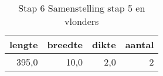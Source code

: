 \begin{table}[h!]
\centering
\caption{Stap 6 Samenstelling stap 5 en vlonders}
\begin{tabular}{rrrr}
\toprule
 lengte &  breedte &  dikte &  aantal \\
\midrule
  395,0 &     10,0 &    2,0 &       2 \\
\bottomrule
\end{tabular}
\end{table}
